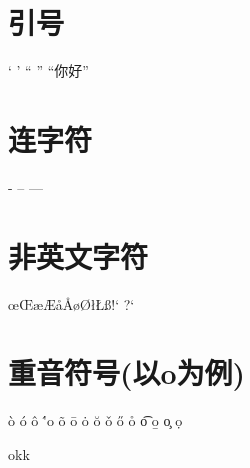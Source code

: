 \documentclass{article}
\begin{document}
    \METAFONT{}
    \MF{}
    \MP{}


    \section{引号}
    `	'	``	''	``你好''
    \section{连字符}
    - -- ---
    \section{非英文字符}
    \oe \OE	\ae	\AE	\aa	\AA	\o	\O	\l	\L \ss \SS !` ?`
    \section{重音符号(以o为例)}
    \`o	\'o	\^o	\''o	\~o	\=o	\.o	\u{o}	\v{o} \H{o} \r{o} \t{o} \b{o} \c{o} \d{o}


    okk
\end{document}
